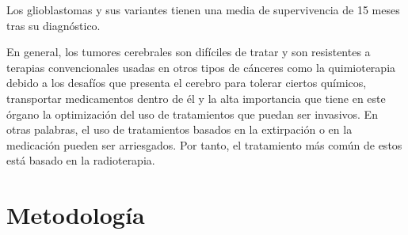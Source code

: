 Los glioblastomas y sus variantes tienen una media de supervivencia de 15 meses tras su diagnóstico.

En general, los tumores cerebrales son difíciles de tratar y son resistentes a terapias convencionales usadas en otros tipos de cánceres como la quimioterapia debido a los desafíos que presenta el cerebro para tolerar ciertos químicos, transportar medicamentos dentro de él y la alta importancia que tiene en este órgano la optimización del uso de tratamientos que puedan ser invasivos. En otras palabras, el uso de tratamientos basados en la extirpación o en la medicación pueden ser arriesgados. Por tanto, el tratamiento más común de estos está basado en la radioterapia.


\section{Metodología}
